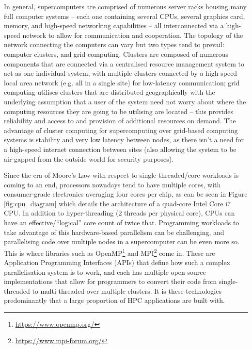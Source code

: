 \documentclass[conference]{IEEEtran}
\begin{document}
In general, supercomputers are comprised of numerous server racks housing many full computer systems – each one containing several CPUs, several graphics card, memory, and high-speed networking capabilities – all interconnected via a high-speed network to allow for communication and cooperation. The topology of the network connecting the computers can vary but two types tend to prevail: computer clusters, and grid computing. Clusters are composed of numerous components that are connected via a centralised resource management system to act as one individual system, with multiple clusters connected by a high-speed local area network (e.g. all in a single site) for low-latency communication; grid computing utilises clusters that are distributed geographically with the underlying assumption that a user of the system need not worry about where the computing resources they are going to be utilising are located – this provides reliability and access to and provision of additional resources on demand. The advantage of cluster computing for supercomputing over grid-based computing systems is stability and very low latency between nodes, as there isn’t a need for a high-speed internet connection between sites (also allowing the system to be air-gapped from the outside world for security purposes).


Since the era of Moore’s Law with respect to single-threaded/core workloads is coming to an end\cite{mooreslaw}, processors nowadays tend to have multiple cores, with consumer-grade electronics averaging four cores per chip, as can be seen in Figure \ref{fig:cpu_diagram} which details the architecture of a quad-core Intel Core i7 CPU. In addition to hyper-threading (2 threads per physical core), CPUs can have an effective/``logical” core count of twice that. Programming workloads to take advantage of this hardware-based parallelism can be challenging, and parallelising code over multiple nodes in a supercomputer can be even more so. This is where libraries such as OpenMP\footnote{\url{https://www.openmp.org/}} and MPI\footnote{\url{https://www.mpi-forum.org/}} come in. These are Application Programming Interfaces (APIs) that define how such a complex parallelisation system is to work, and each has multiple open-source implementations that allow for programmers to convert their code from single-threaded to multi-threaded over multiple clusters. It is these technologies predominantly that a large proportion of HPC applications are built with.
\end{document}
